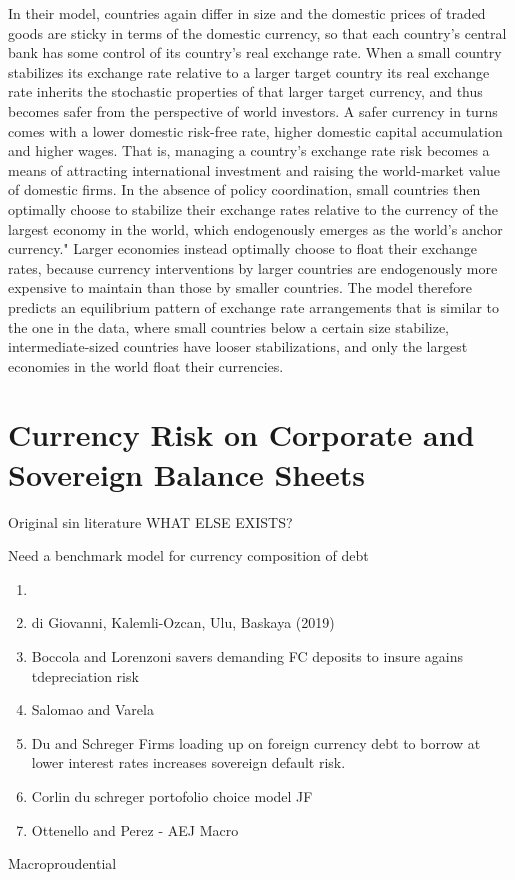 \documentclass{ar-1col}
\begin{document}
In their model, countries again differ in size and the domestic prices of traded goods are sticky in terms of the domestic currency, so that each country's central bank has some control of its country's real exchange rate. When a small country stabilizes its exchange rate relative to a larger target country its real exchange rate inherits the stochastic properties of that larger target currency, and thus becomes safer from the perspective of world investors. A safer currency in turns comes with a lower domestic risk-free rate, higher domestic capital accumulation and higher wages. That is, managing a country's exchange rate risk becomes a means of attracting international investment and raising the world-market value of domestic firms. 
In the absence of policy coordination, small countries then optimally choose to
stabilize their exchange rates relative to the currency of the largest economy in the world,
which endogenously emerges as the world's anchor currency." Larger economies instead
optimally choose to 
float their exchange rates, because currency interventions by larger countries are endogenously more expensive to maintain than those by smaller countries. The model therefore predicts an equilibrium pattern of exchange rate arrangements that is similar to the one in the data, where small countries below a certain size stabilize, intermediate-sized countries have looser stabilizations, and only the largest economies in the world float their currencies.

\section{Currency Risk on Corporate and Sovereign Balance Sheets}
Original sin literature WHAT ELSE EXISTS?

Need a benchmark model for currency composition of debt
\begin{enumerate}
\item \citet{Richers2019}
\item di Giovanni, Kalemli-Ozcan, Ulu, Baskaya (2019)
\item Boccola and Lorenzoni savers demanding FC deposits to insure agains tdepreciation risk
\item Salomao and Varela
\item Du and Schreger Firms loading up on foreign currency debt to borrow at lower interest rates increases sovereign default risk.
\item Corlin du schreger portofolio choice model JF
\item Ottenello and Perez - AEJ Macro
\end{enumerate} 
Macroproudential
\end{document}
